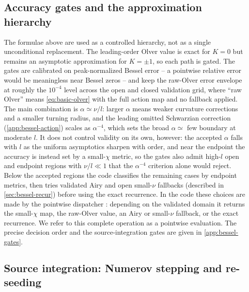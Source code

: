 \documentclass[prd, twocolumn, superscriptaddress, tightenlines, longbibliography, nofootinbib, eqsecnum, amsfonts, amsmath, floatfix, notitlepage]{revtex4-2}
\newcommand{\code}[1]{\texttt{\detokenize{#1}}}
\begin{document}
\subsection{Accuracy gates and the approximation hierarchy}
\label{sec:bessel-gates}

The formulae above are used as a controlled hierarchy, not as a single
unconditional replacement. The leading-order Olver value is exact for $K=0$ but
remains an asymptotic approximation for $K=\pm1$, so each path is gated. The
gates are calibrated on peak-normalized Bessel error -- a pointwise relative
error would be meaningless near Bessel zeros -- and keep the raw-Olver error
envelope at
roughly the $10^{-4}$ level across the open and closed validation grid, where
``raw Olver'' means \cref{eq:basic-olver} with the full action map and no
fallback applied. The main
combination is $\alpha\simeq\nu/l$: larger $\alpha$ means weaker curvature
corrections and a smaller turning radius, and the leading omitted Schwarzian
correction (\cref{app:bessel-action}) scales
as $\alpha^{-4}$, which sets the broad $\alpha\simeq$ few boundary at moderate $l$.
It does not control validity on its own, however: the accepted $\alpha$ falls with
$l$ as the uniform asymptotics sharpen with order, and near the endpoint the
accuracy is instead set by a small-$\chi$ metric, so the gates also admit high-$l$
open and endpoint regions with $\nu/l\ll1$ that the $\alpha^{-4}$ criterion alone
would reject. Below the accepted regions the code
classifies the remaining cases by endpoint metrics, then tries validated Airy and open
small-$\nu$ fallbacks (described in \cref{sec:bessel-recur}) before using the
exact recurrence. In the code these choices are made by the pointwise
dispatcher \code{phi_olver}: depending on the validated domain it returns the
small-$\chi$ map, the raw-Olver value, an Airy or small-$\nu$ fallback, or the
exact recurrence. We refer to this complete operation as a pointwise
evaluation. The precise
decision order and the source-integration gates are given in
\cref{app:bessel-gates}.

\subsection{Source integration: Numerov stepping and re-seeding}
\label{sec:bessel-numerov}
\end{document}
